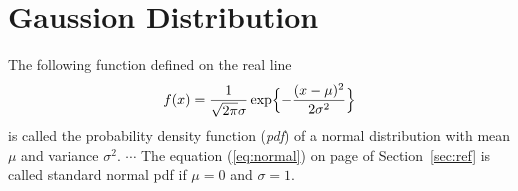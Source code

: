\documentclass[11pt]{article}
\begin{document}
\section{Gaussion Distribution \label{sec:ref}} 
The following function defined on the real line
\begin{equation} \label{eq:normal}
f(x) = \frac{1}{\sqrt{2\pi}\sigma} \exp\Bigl\{-\frac{(x-\mu)^2}{2\sigma^2}\Bigr\}
\end{equation}
is called the probability density function (\emph{pdf}) of a normal distribution with mean $\mu$ and variance $\sigma^2$. $\cdots$ The equation (\eqref{eq:normal}) on page \pageref{eq:normal} of Section~\ref{sec:ref} is called standard normal pdf if $\mu=0$ and $\sigma=1$.
\end{document}
